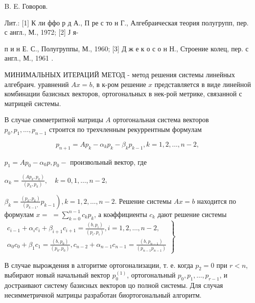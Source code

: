 \documentclass[10pt]{article}
\begin{document}
B. E. Говоров.



Лит.: [1] К ли ффо р д А., П ре с то н Г., Алгебраическая теория полугрупп, пер. с англ., М., 1972; [2] Ј я-

п и н Е. С., Полугруппы, М., 1960; [3] Д ж е к о с о н Н., Строение колец, пер. с англ., М., 1961 .



МИНИМАЛЬНЫХ ИТЕРАЦИЙ МЕТОД - метод решения системы линейных алгебраич. уравнений $A x=b$, в к-ром решение $x$ представляется в виде линейной комбинации базисных векторов, ортогональных в нек-рой метрике, связанной с матрицей системы.



В случае симметритной матрицы $A$ ортогональная система векторов $p_{0}, p_{1}, \ldots, p_{n-1}$ строится по трехчленным рекуррентным формулам



\[

p_{n+1}=A p_{k}-\alpha_{k} p_{k}-\beta_{k} p_{k-1}, k=1,2, \ldots, n-2,

\]



$p_{1}=A p_{0}-\alpha_{0} p, p_{0}-$ произвольный вектор, где



$\alpha_{k}=\frac{\left(A p_{k}, p_{k}\right)}{\left(p_{k}, p_{k}\right)}, \quad k=0,1, \ldots, n-2$,



$\left.\beta_{k}=\frac{\left(p_{k}, p_{k}\right)}{\left(p_{k-1},\right.} p_{k-1}\right), k=1,2, \ldots, n-2$. Решение системы $A x=b$ находится по формулам $x=$ $=\sum_{k=0}^{n-1} c_{k} p_{k}$, а коәффициенты $c_{k}$ дают решение системы $\left.\begin{array}{l}c_{i-1}+\alpha_{i} c_{i}+\beta_{i+1} c_{i+1}=\frac{\left(b, p_{i}\right)}{\left(p_{i}, p_{i}\right)}, i=1,2, \ldots, n-2, \\ \alpha_{0} c_{0}+\beta_{1} c_{1}=\frac{\left(b, p_{0}\right)}{\left(p_{0}, p_{0}\right)}, c_{n-2}+\alpha_{n-1} c_{n-1}=\frac{\left(b, p_{n-1}\right)}{\left(p_{n-1} p_{n-1}\right)}\end{array}\right\}$



В случае вырождения в алгоритме ортогонализации, т. е. когда $p_{2}=0$ при $r<n$, выбирают новый начальный вектор $p_{0}^{(1)}$, ортогональный $p_{0}, p_{1}, \ldots, p_{r-1}$, и достраивают систему базисных векторов цо полной системы. Для случая несимметричной матрицы разработан биортогональный алгоритм.
\end{document}
